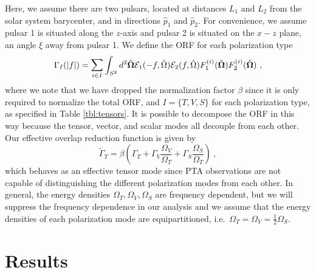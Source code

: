 \documentclass[prd,aps,psfig,nofootinbib,nobibnotes,superscriptaddress,preprintnumbers,times]{revtex4-2}\setlength{\topmargin}{-14mm}
\begin{document}
Here, we assume there are two pulsars, located at distances $L_1$ and $L_2$ from the solar system barycenter, and in directions $\hat{p}_1$ and $\hat{p}_2$. For convenience, we assume pulsar 1 is situated along the $z$-axis and pulsar 2 is situated on the $x-z$ plane, an angle $\xi$ away from pulsar 1. We define the ORF for each polarization type
\begin{equation}\label{eq:orf_type}
    \Gamma_I(|f|) = \mathlarger{\sum}_{i \in I} \int_{S^2} d^2 \hat{\bf{\Omega}} \mathcal{E}_1(-f, \hat{\Omega}) \mathcal{E}_2(f, \hat{\Omega}) F_1^{(i)}(\hat{\bf{\Omega}}) F_2^{(i)}(\hat{\bf{\Omega}}) \ ,
\end{equation}
where we note that we have dropped the normalization factor $\beta$ since it is only required to normalize the total ORF, and $I = \{T,V,S\}$ for each polarization type, as specified in Table \ref{tbl:tensors}. It is possible to decompose the ORF in this way because the tensor, vector, and scalar modes all decouple from each other. Our effective overlap reduction function is given by 
\begin{equation}\label{eq:eff_orf}
    \tilde{\Gamma}_{T} = \beta \left(\Gamma_{T} + \Gamma_{V} \frac{\Omega_V}{\Omega_T} + \Gamma_{S} \frac{\Omega_S}{\Omega_T} \right) \ ,
\end{equation}
which behaves as an effective tensor mode since PTA observations are not capable of distinguishing the different polarization modes from each other. In general, the energy densities $\Omega_T, \Omega_V, \Omega_S$ are frequency dependent, but we will suppress the frequency dependence in our analysis and we assume that the energy densities of each polarization mode are equipartitioned, i.e.\ $\Omega_T = \Omega_V = \frac{1}{2}\Omega_S$. 

\section{Results}\label{sec:results}
\end{document}
